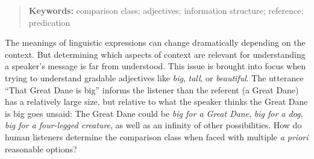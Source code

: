 \documentclass[10pt,letterpaper]{article}
\begin{document}
\begin{quote}
\small
\textbf{Keywords:} 
comparison class; adjectives; information structure; reference; predication
\end{quote}
The meanings of linguistic expressions can change dramatically depending on the context. 
But determining which aspects of context are relevant for understanding a speaker's message is far from understood.
This issue is brought into focus when trying to understand gradable adjectives like \emph{big}, \emph{tall}, or \emph{beautiful}.
The utterance ``That Great Dane is big'' informs the listener than the referent (a Great Dane) has a relatively large size, but relative to what the speaker thinks the Great Dane is big goes unsaid: The Great Dane could be \textit{big for a Great Dane},  \textit{big for a dog}, \textit{big for a four-legged creature}, as well as an infinity of other possibilities. 
How do human listeners determine the comparison class when faced with multiple \textit{a priori} reasonable options? 
\end{document}
